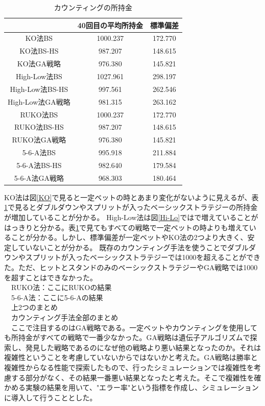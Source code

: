 \begin{table}[H]
 \caption{カウンティングの所持金\label{countting}}
 \begin{center}
  \begin{tabular}{|c|c|c|}
  \hline  & 40回目の平均所持金 & 標準偏差 \\
  \hline KO法BS & 1000.237 & 172.770\\
  \hline KO法BS-HS & 987.207 & 148.615 \\
  \hline KO法GA戦略 & 976.380 & 145.821\\
  \hline High-Low法BS & 1027.961 & 298.197\\
  \hline High-Low法BS-HS  & 997.561 & 262.546\\
  \hline High-Low法GA戦略 & 981.315 & 263.162\\
  \hline RUKO法BS & 1000.237 & 172.770\\
  \hline RUKO法BS-HS & 987.207 & 148.615 \\
  \hline RUKO法GA戦略 & 976.380 & 145.821\\
  \hline 5-6-A法BS & 995.918 & 211.884\\
  \hline 5-6-A法BS-HS & 982.640 & 179.584 \\
  \hline 5-6-A法GA戦略 & 968.303 & 180.464\\
  \hline
  \end{tabular}
 \end{center}
\end{table}

KO法は図\ref{KO}で見ると一定ベットの時とあまり変化がないように見えるが、表\ref{countting}で見るとダブルダウンやスプリットが入ったベーシックストラテジーの所持金が増加していることが分かる。
 High-Low法は図\ref{Hi-Lo}ではで増えていることがはっきりと分かる。表\ref{countting}で見てもすべての戦略で一定ベットの時よりも増えていることが分かる。しかし、標準偏差が一定ベットやKO法の2つより大きく、安定していないことが分かる。
 既存のカウンティング手法を使うことでダブルダウンやスプリットが入ったベーシックストラテジーでは1000を超えることができた。ただ、ヒットとスタンドのみのベーシックストラテジーやGA戦略では1000を超すことはできなかった。\\
　RUKO法：ここにRUKOの結果\\
　5-6-A法：ここに5-6-Aの結果\\
　上2つのまとめ\\
　カウンティング手法全部のまとめ\\
　ここで注目するのはGA戦略である。一定ベットやカウンティングを使用しても所持金がすべての戦略で一番少なかった。GA戦略は遺伝子アルゴリズムで探索し、発見した戦略であるのになぜ他の戦略より悪い結果となったのか。それは複雑性ということを考慮していないからではないかと考えた。GA戦略は勝率と複雑性からなる性能で探索したもので、行ったシミュレーションでは複雑性を考慮する部分がなく、その結果一番悪い結果となったと考えた。そこで複雑性を確かめる実験の結果を用いて、"エラー率"という指標を作成し、シミュレーションに導入して行うこととした。

